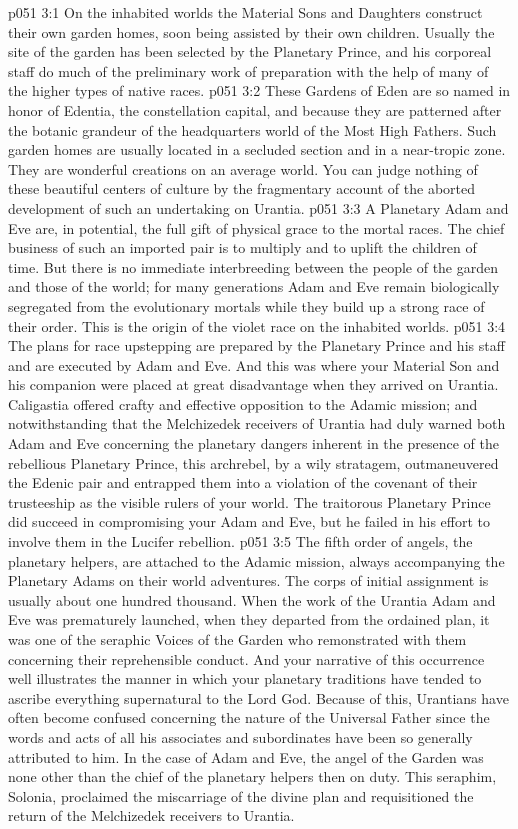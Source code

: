 \vs p051 3:1 On the inhabited worlds the Material Sons and Daughters construct their own garden homes, soon being assisted by their own children. Usually the site of the garden has been selected by the Planetary Prince, and his corporeal staff do much of the preliminary work of preparation with the help of many of the higher types of native races.
\vs p051 3:2 These Gardens of Eden are so named in honor of Edentia, the constellation capital, and because they are patterned after the botanic grandeur of the headquarters world of the Most High Fathers. Such garden homes are usually located in a secluded section and in a near\hyp{}tropic zone. They are wonderful creations on an average world. You can judge nothing of these beautiful centers of culture by the fragmentary account of the aborted development of such an undertaking on Urantia.
\pc \vs p051 3:3 A Planetary Adam and Eve are, in potential, the full gift of physical grace to the mortal races. The chief business of such an imported pair is to multiply and to uplift the children of time. But there is no immediate interbreeding between the people of the garden and those of the world; for many generations Adam and Eve remain biologically segregated from the evolutionary mortals while they build up a strong race of their order. This is the origin of the violet race on the inhabited worlds.
\vs p051 3:4 The plans for race upstepping are prepared by the Planetary Prince and his staff and are executed by Adam and Eve. And this was where your Material Son and his companion were placed at great disadvantage when they arrived on Urantia. Caligastia offered crafty and effective opposition to the Adamic mission; and notwithstanding that the Melchizedek receivers of Urantia had duly warned both Adam and Eve concerning the planetary dangers inherent in the presence of the rebellious Planetary Prince, this archrebel, by a wily stratagem, outmaneuvered the Edenic pair and entrapped them into a violation of the covenant of their trusteeship as the visible rulers of your world. The traitorous Planetary Prince did succeed in compromising your Adam and Eve, but he failed in his effort to involve them in the Lucifer rebellion.
\pc \vs p051 3:5 The fifth order of angels, the planetary helpers, are attached to the Adamic mission, always accompanying the Planetary Adams on their world adventures. The corps of initial assignment is usually about one hundred thousand. When the work of the Urantia Adam and Eve was prematurely launched, when they departed from the ordained plan, it was one of the seraphic Voices of the Garden who remonstrated with them concerning their reprehensible conduct. And your narrative of this occurrence well illustrates the manner in which your planetary traditions have tended to ascribe everything supernatural to the Lord God. Because of this, Urantians have often become confused concerning the nature of the Universal Father since the words and acts of all his associates and subordinates have been so generally attributed to him. In the case of Adam and Eve, the angel of the Garden was none other than the chief of the planetary helpers then on duty. This seraphim, Solonia, proclaimed the miscarriage of the divine plan and requisitioned the return of the Melchizedek receivers to Urantia.\plusone
